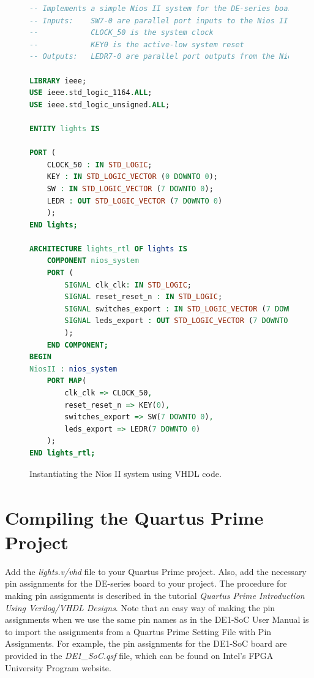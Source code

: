 \documentclass[11pt, twoside, pdftex]{article}
\begin{document}
\begin{figure}[H]
\begin{center}
\begin{lstlisting}[language=VHDL]
-- Implements a simple Nios II system for the DE-series board.
-- Inputs:    SW7-0 are parallel port inputs to the Nios II system
--            CLOCK_50 is the system clock
--            KEY0 is the active-low system reset
-- Outputs:   LEDR7-0 are parallel port outputs from the Nios II system

LIBRARY ieee;
USE ieee.std_logic_1164.ALL;
USE ieee.std_logic_unsigned.ALL;

ENTITY lights IS

PORT (
    CLOCK_50 : IN STD_LOGIC;
    KEY : IN STD_LOGIC_VECTOR (0 DOWNTO 0);
    SW : IN STD_LOGIC_VECTOR (7 DOWNTO 0);
    LEDR : OUT STD_LOGIC_VECTOR (7 DOWNTO 0)
    );
END lights;

ARCHITECTURE lights_rtl OF lights IS
    COMPONENT nios_system
    PORT (
        SIGNAL clk_clk: IN STD_LOGIC;
        SIGNAL reset_reset_n : IN STD_LOGIC;
        SIGNAL switches_export : IN STD_LOGIC_VECTOR (7 DOWNTO 0);
        SIGNAL leds_export : OUT STD_LOGIC_VECTOR (7 DOWNTO 0)
        );
    END COMPONENT;
BEGIN
NiosII : nios_system
    PORT MAP(
        clk_clk => CLOCK_50,
        reset_reset_n => KEY(0),
        switches_export => SW(7 DOWNTO 0),
        leds_export => LEDR(7 DOWNTO 0)
    );
END lights_rtl;
\end{lstlisting}
\end{center}
	\caption{Instantiating the Nios II system using VHDL code.}
	\label{fig:23}
\end{figure}


\section{Compiling the Quartus\textsuperscript{\textregistered} Prime Project}

Add the {\it lights.v/vhd} file to your Quartus Prime project.
Also, add the necessary pin assignments for the DE-series board to your project.
The procedure for making pin assignments is described in the tutorial 
{\it Quartus Prime Introduction Using Verilog/VHDL Designs}. Note that an easy way of
making the pin assignments when we use the same pin names as in the DE1-SoC 
User Manual is to import the assignments from a Quartus Prime Setting File with Pin Assignments. 
For example, the pin assignments for the DE1-SoC board are provided in the {\it DE1\_SoC.qsf} file, 
which can be found on Intel's FPGA University Program website. 
\end{document}
